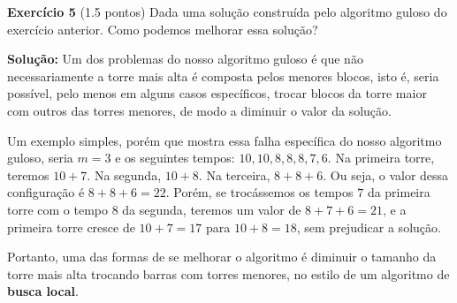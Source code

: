 \noindent \textbf{Exercício 5} (1.5 pontos) Dada uma solução construída pelo algoritmo guloso
do exercício anterior. Como podemos melhorar essa solução?

\bigskip

\noindent \textbf{Solução:}
Um dos problemas do nosso algoritmo guloso é que não necessariamente a torre mais alta é composta pelos menores blocos, isto é, seria possível, pelo menos em alguns casos específicos, trocar blocos da torre maior com outros das torres menores, de modo a diminuir o valor da solução.

Um exemplo simples, porém que mostra essa falha específica do nosso algoritmo guloso, seria $m = 3$ e os seguintes tempos: $10, 10, 8, 8, 8, 7, 6$. Na primeira torre, teremos $10+7$. Na segunda, $10+8$. Na terceira, $8+8+6$. Ou seja, o valor dessa configuração é $8+8+6=22$. Porém, se trocássemos os tempos $7$ da primeira torre com o tempo $8$ da segunda, teremos um valor de $8+7+6=21$, e a primeira torre cresce de $10+7=17$ para $10+8=18$, sem prejudicar a solução.

Portanto, uma das formas de se melhorar o algoritmo é diminuir o tamanho da torre mais alta trocando barras com torres menores, no estilo de um algoritmo de \textbf{busca local}.
